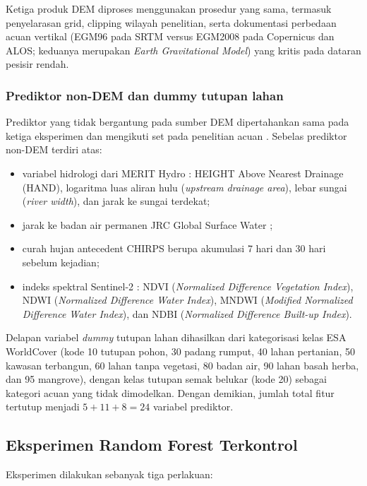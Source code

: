 \documentclass[12pt]{article}
\begin{document}
Ketiga produk DEM diproses menggunakan prosedur yang sama, termasuk
penyelarasan grid, clipping wilayah penelitian, serta dokumentasi perbedaan
acuan vertikal (EGM96 pada SRTM versus EGM2008 pada Copernicus dan ALOS;
keduanya merupakan \textit{Earth Gravitational Model})
yang kritis pada dataran pesisir rendah.

\subsubsection{Prediktor non-DEM dan dummy tutupan lahan}

Prediktor yang tidak bergantung pada sumber DEM dipertahankan sama pada
ketiga eksperimen dan mengikuti set pada penelitian acuan \cite{hakim2026}.
Sebelas prediktor non-DEM terdiri atas:

\begin{itemize}
\item variabel hidrologi dari MERIT Hydro \cite{yamazaki2019}: HEIGHT
Above Nearest Drainage (HAND), logaritma luas aliran hulu
(\textit{upstream drainage area}), lebar sungai (\textit{river width}), dan
jarak ke sungai terdekat;
\item jarak ke badan air permanen JRC Global Surface Water
\cite{pekel2016};
\item curah hujan antecedent CHIRPS \cite{funk2015} berupa akumulasi 7 hari
dan 30 hari sebelum kejadian;
\item indeks spektral Sentinel-2 \cite{saha2021}: NDVI
(\textit{Normalized Difference Vegetation Index}), NDWI
(\textit{Normalized Difference Water Index}), MNDWI (\textit{Modified
Normalized Difference Water Index}), dan NDBI (\textit{Normalized
Difference Built-up Index}).
\end{itemize}

Delapan variabel \textit{dummy} tutupan lahan dihasilkan dari
kategorisasi kelas ESA WorldCover \cite{zanaga2021} (kode 10 tutupan pohon,
30 padang rumput, 40 lahan pertanian, 50 kawasan terbangun, 60 lahan tanpa
vegetasi, 80 badan air, 90 lahan basah herba, dan 95 mangrove), dengan kelas
tutupan semak belukar (kode 20) sebagai kategori acuan yang tidak
dimodelkan. Dengan demikian, jumlah total fitur tertutup menjadi
$5+11+8=24$ variabel prediktor.

\subsection{Eksperimen Random Forest Terkontrol}

Eksperimen dilakukan sebanyak tiga perlakuan:
\end{document}
